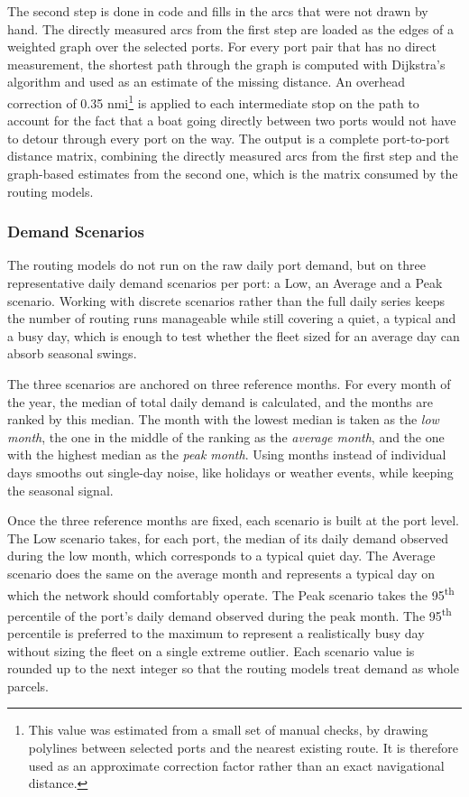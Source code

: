 \documentclass[12pt]{article}
\begin{document}
The second step is done in code and fills in the arcs that were not drawn by hand. The directly measured arcs from the first step are loaded as the edges of a weighted graph over the selected ports. For every port pair that has no direct measurement, the shortest path through the graph is computed with Dijkstra's algorithm and used as an estimate of the missing distance. An overhead correction of 0.35 nmi\footnote{This value was estimated from a small set of manual checks, by drawing polylines between selected ports and the nearest existing route. It is therefore used as an approximate correction factor rather than an exact navigational distance.} is applied to each intermediate stop on the path to account for the fact that a boat going directly between two ports would not have to detour through every port on the way. The output is a complete port-to-port distance matrix, combining the directly measured arcs from the first step and the graph-based estimates from the second one, which is the matrix consumed by the routing models.

\subsubsection{Demand Scenarios}
\label{subsubsec:demand-scenarios}

The routing models do not run on the raw daily port demand, but on three representative daily demand scenarios per port: a Low, an Average and a Peak scenario. Working with discrete scenarios rather than the full daily series keeps the number of routing runs manageable while still covering a quiet, a typical and a busy day, which is enough to test whether the fleet sized for an average day can absorb seasonal swings.

The three scenarios are anchored on three reference months. For every month of the year, the median of total daily demand is calculated, and the months are ranked by this median. The month with the lowest median is taken as the \textit{low month}, the one in the middle of the ranking as the \textit{average month}, and the one with the highest median as the \textit{peak month}. Using months instead of individual days smooths out single-day noise, like holidays or weather events, while keeping the seasonal signal.

Once the three reference months are fixed, each scenario is built at the port level. The Low scenario takes, for each port, the median of its daily demand observed during the low month, which corresponds to a typical quiet day. The Average scenario does the same on the average month and represents a typical day on which the network should comfortably operate. The Peak scenario takes the 95\textsuperscript{th} percentile of the port's daily demand observed during the peak month. The 95\textsuperscript{th} percentile is preferred to the maximum to represent a realistically busy day without sizing the fleet on a single extreme outlier. Each scenario value is rounded up to the next integer so that the routing models treat demand as whole parcels.
\end{document}
